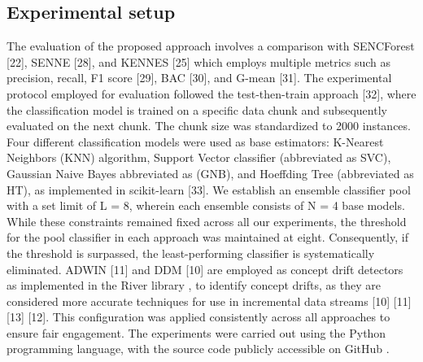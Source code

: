\subsection{Experimental setup}
The evaluation of the proposed approach involves a comparison with SENCForest [22], SENNE [28], and KENNES [25] which employs multiple metrics such as precision, recall, F1 score [29], BAC [30], and G-mean [31]. The experimental protocol employed for evaluation followed the test-then-train approach [32], where the classification model is trained on a specific data chunk and subsequently evaluated on the next chunk. The chunk size was standardized to 2000 instances. Four different classification models were used as base estimators: K-Nearest Neighbors (KNN) algorithm, Support Vector classifier (abbreviated as SVC), Gaussian Naive Bayes abbreviated as (GNB), and Hoeffding Tree (abbreviated as HT), as implemented in scikit-learn [33]. We establish an ensemble classifier pool with a set limit of L = 8, wherein each ensemble consists of N = 4 base models. While these constraints remained fixed across all our experiments, the threshold for the pool classifier in each approach was maintained at eight. Consequently, if the threshold is surpassed, the least-performing classifier is systematically eliminated. ADWIN [11] and DDM [10] are employed as concept drift detectors as implemented in the River library , to identify concept drifts, as they are considered more accurate techniques for use in incremental data streams [10] [11] [13] [12]. This configuration was applied consistently across all approaches to ensure fair engagement. The experiments were carried out using the Python programming language, with the source code publicly accessible on GitHub . 
